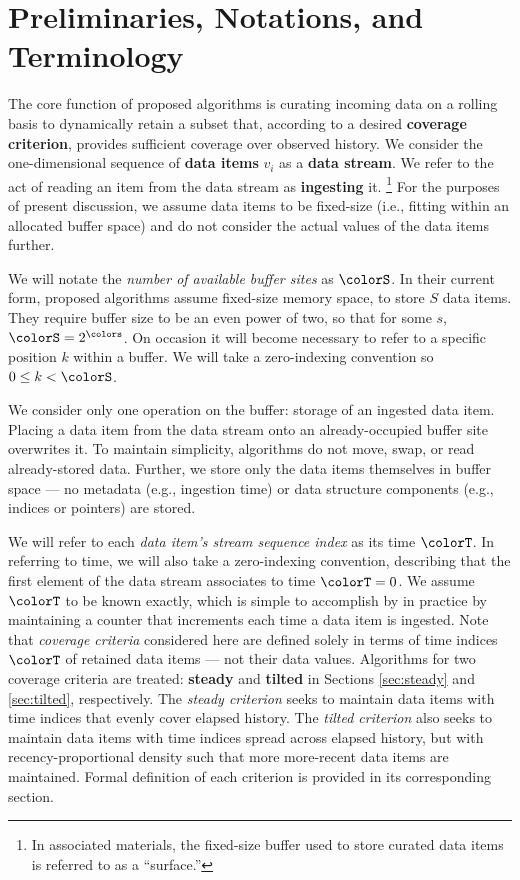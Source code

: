 \section{Preliminaries, Notations, and Terminology} \label{sec:notation}

The core function of proposed algorithms is curating incoming data on a rolling basis to dynamically retain a subset that, according to a desired \textbf{coverage criterion}, provides sufficient coverage over observed history.
We consider the one-dimensional sequence of \textbf{data items} $v_i$ as a \textbf{data stream}.
We refer to the act of reading an item from the data stream as \textbf{ingesting} it.%
\footnote{%
In associated materials, the fixed-size buffer used to store curated data items is referred to as a ``surface.''%
}
For the purposes of present discussion, we assume data items to be fixed-size (i.e., fitting within an allocated buffer space) and do not consider the actual values of the data items further.

We will notate the \textit{number of available buffer sites} as $\colorS$.
In their current form, proposed algorithms assume fixed-size memory space, to store $S$ data items.
They require buffer size to be an even power of two, so that for some $s$, $\colorS = 2^{\colors}$.
On occasion it will become necessary to refer to a specific position $k$ within a buffer.
We will take a zero-indexing convention so $0 \leq k < \colorS$.

We consider only one operation on the buffer: storage of an ingested data item.
Placing a data item from the data stream onto an already-occupied buffer site overwrites it.
To maintain simplicity, algorithms do not move, swap, or read already-stored data.
Further, we store only the data items themselves in buffer space --- no metadata (e.g., ingestion time) or data structure components (e.g., indices or pointers) are stored.

We will refer to each \textit{data item's stream sequence index} as its time $\colorT$.
In referring to time, we will also take a zero-indexing convention, describing that the first element of the data stream associates to time $\colorT=0$.
We assume $\colorT$ to be known exactly, which is simple to accomplish by in practice by maintaining a counter that increments each time a data item is ingested.
Note that \textit{coverage criteria} considered here are defined solely in terms of time indices $\colorT$ of retained data items --- not their data values.
Algorithms for two coverage criteria are treated: \textbf{steady} and \textbf{tilted} in Sections \ref{sec:steady} and \ref{sec:tilted}, respectively.
The \textit{steady criterion} seeks to maintain data items with time indices that evenly cover elapsed history.
The \textit{tilted criterion} also seeks to maintain data items with time indices spread across elapsed history, but with recency-proportional density such that more more-recent data items are maintained.
Formal definition of each criterion is provided in its corresponding section.

